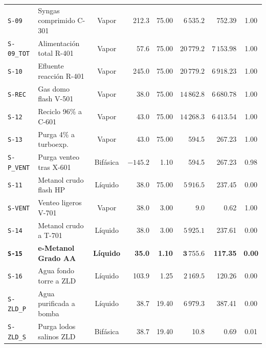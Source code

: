 \documentclass[11pt,letterpaper]{article}
\begin{document}
\begin{center}
\begin{tabularx}{\textwidth}{lp{4.2cm}crrrrc}
\texttt{S-09} & Syngas comprimido C-301 & Vapor & 212.3 & 75.00 & $6\,535.2$ & 752.39 & 1.00 \\
\texttt{S-09\_TOT} & Alimentación total R-401 & Vapor & 57.6 & 75.00 & $20\,779.2$ & $7\,153.98$ & 1.00 \\
\texttt{S-10} & Efluente reacción R-401 & Vapor & 245.0 & 75.00 & $20\,779.2$ & $6\,918.23$ & 1.00 \\
\texttt{S-REC} & Gas domo flash V-501 & Vapor & 38.0 & 75.00 & $14\,862.8$ & $6\,680.78$ & 1.00 \\
\texttt{S-12} & Reciclo 96\% a C-601 & Vapor & 43.0 & 75.00 & $14\,268.3$ & $6\,413.54$ & 1.00 \\
\texttt{S-13} & Purga 4\% a turboexp. & Vapor & 43.0 & 75.00 & 594.5 & 267.23 & 1.00 \\
\texttt{S-P\_VENT}& Purga venteo tras X-601 & Bifásica & $-145.2$ & 1.10 & 594.5 & 267.23 & 0.98 \\
\texttt{S-11} & Metanol crudo flash HP & Líquido & 38.0 & 75.00 & $5\,916.5$ & 237.45 & 0.00 \\
\texttt{S-VENT} & Venteo ligeros V-701 & Vapor & 38.0 & 3.00 & 9.0 & 0.62 & 1.00 \\
\texttt{S-14} & Metanol crudo a T-701 & Líquido & 38.0 & 3.00 & $5\,925.1$ & 237.61 & 0.00 \\
\textbf{\texttt{S-15}} & \textbf{e-Metanol Grado AA} & \textbf{Líquido} & \textbf{35.0} & \textbf{1.10} & $\mathbf{3\,755.6}$ & \textbf{117.35} & \textbf{0.00} \\
\texttt{S-16} & Agua fondo torre a ZLD & Líquido & 103.9 & 1.25 & $2\,169.5$ & 120.26 & 0.00 \\
\texttt{S-ZLD\_P} & Agua purificada a bomba & Líquido & 38.7 & 19.40 & $6\,979.3$ & 387.41 & 0.00 \\
\texttt{S-ZLD\_S} & Purga lodos salinos ZLD & Bifásica & 38.7 & 19.40 & 10.8 & 0.69 & 0.01 \\
\bottomrule
\end{tabularx}
\end{center}
\end{document}
